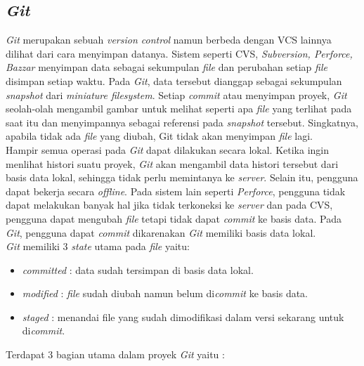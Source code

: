 \subsection{\textit{Git}}
\textit{Git} merupakan sebuah \textit{version control} namun berbeda dengan VCS lainnya dilihat dari cara menyimpan datanya. Sistem seperti CVS, \textit{Subversion, Perforce, Bazzar} menyimpan data sebagai sekumpulan \textit{file} dan perubahan setiap \textit{file} disimpan setiap waktu. Pada \textit{Git}, data tersebut dianggap sebagai sekumpulan \textit{snapshot} dari \textit{miniature filesystem}. Setiap \textit{commit} atau menyimpan proyek, \textit{Git} seolah-olah mengambil gambar untuk melihat seperti apa \textit{file} yang terlihat pada saat itu dan menyimpannya sebagai referensi pada \textit{snapshot} tersebut. Singkatnya, apabila tidak ada \textit{file} yang diubah, Git tidak akan menyimpan \textit{file} lagi.\\

Hampir semua operasi pada \textit{Git} dapat dilakukan secara lokal. Ketika ingin menlihat histori suatu proyek, \textit{Git} akan mengambil data histori tersebut dari basis data lokal, sehingga tidak perlu memintanya ke \textit{server}. Selain itu, pengguna dapat bekerja secara \textit{offline}. Pada sistem lain seperti \textit{Perforce}, pengguna tidak dapat melakukan banyak hal jika tidak terkoneksi ke \textit{server} dan pada CVS, pengguna dapat mengubah \textit{file} tetapi tidak dapat \textit{commit} ke basis data. Pada \textit{Git}, pengguna dapat \textit{commit} dikarenakan \textit{Git} memiliki basis data lokal.\\

\textit{Git} memiliki 3 \textit{state} utama pada \textit{file} yaitu: 

\begin{itemize}
	\item \textit{committed} : data sudah tersimpan di basis data lokal.
	\item \textit{modified} : \textit{file} sudah diubah namun belum di\textit{commit} ke basis data.
	\item \textit{staged} : menandai file yang sudah dimodifikasi dalam versi sekarang untuk di\textit{commit}.
\end{itemize}

Terdapat 3 bagian utama dalam proyek \textit{Git} yaitu : 

